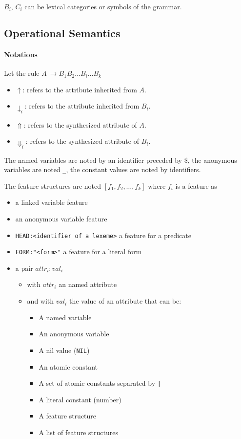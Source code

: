 \documentclass[11pt]{article}
\begin{document}
$B_i$, $C_i$ can be lexical categories or symbols of the
grammar.

\subsection{Operational Semantics}

\paragraph{Notations}

Let the rule
$A~ \rightarrow B_1 B_2 \dots B_i \dots B_k$

\begin{itemize}
\item $\uparrow$: refers to the attribute inherited from $A$.
\item $\downarrow_i$: refers to the attribute inherited from $B_i$.
\item $\Uparrow$: refers to the synthesized attribute of $A$.
\item $\Downarrow_i$: refers to the synthesized attribute of $B_i$. 
\end{itemize}

The named variables are noted by an identifier preceded by \og
\$\fg{}, the anonymous variables are noted \og \verb#_#\fg{}, the
constant values are noted by identifiers.

The feature structures are noted $[ f_1, f_2, \dots, f_k ]$
where $ f_i$ is a feature as
\begin{itemize}
\item a linked variable feature
\item an anonymous variable feature
\item \verb#HEAD:<identifier of a lexeme># a feature for a predicate
\item \verb#FORM:"<form>"# a feature for a literal form
\item a pair $attr_i:val_i$
  \begin{itemize}
  \item with $attr_i$ an named attribute
  \item and with $val_i$ the value of an attribute that can be: 
    
    \begin{itemize}
    \item A named variable
    \item An anonymous variable
    \item A nil value (\texttt{NIL})
    \item An atomic constant
    \item A set of atomic constants separated by \verb#|#
    \item A literal constant (number)
    \item A feature structure
    \item A list of feature structures
    \end{itemize}
  \end{itemize}
  
\end{itemize}
\end{document}
